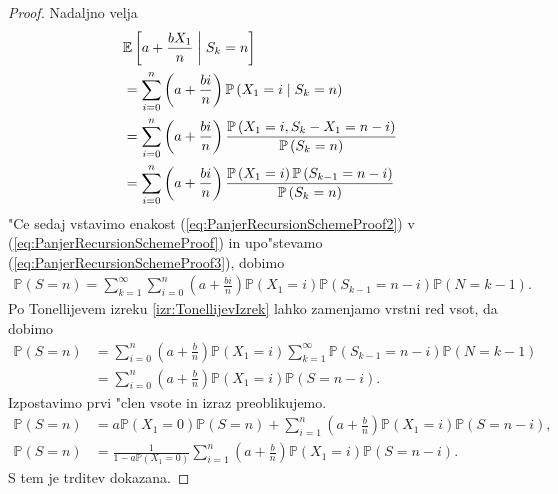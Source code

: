 \documentclass[12pt, a4paper, reqno]{amsart}
\theoremstyle{definition}
\theoremstyle{plain}
\newcommand{\E}{\mathbb{E}}
\newcommand{\Prob}{\mathbb{P}}
\newcommand{\1}{\mathds{1}}
\newcommand*{\refPriloga}[1]{%
  \begingroup
    \hypersetup{
      linkcolor=red,
      linkbordercolor=red,
    }%
    \ref{#1}%
  \endgroup
}
\begin{document}
\begin{proof}
        Nadaljno velja  
        \begin{align}   
            & \E\left[a + \frac{bX_1}{n} \biggm|   S_k = n\right] \nonumber \\
            &= \sum_{i = 0}^n\left(a + \frac{bi}{n}\right)\Prob\left(X_1 = i\mid S_k = n\right) \nonumber \\
            &= \sum_{i = 0}^n\left(a + \frac{bi}{n}\right)\frac{\Prob\left(X_1 = i, S_k - X_1 = n - i\right)}{\Prob\left(S_k = n\right)} \nonumber \\
            &= \sum_{i = 0}^n\left(a + \frac{bi}{n}\right)\frac{\Prob\left(X_1 = i\right)\Prob\left(S_{k- 1} = n - i\right)}{\Prob\left(S_k = n\right)} \label{eq:PanjerRecursionSchemeProof3} 
        \end{align}
        "Ce sedaj vstavimo enakost (\ref{eq:PanjerRecursionSchemeProof2}) v (\ref{eq:PanjerRecursionSchemeProof}) 
        in upo"stevamo (\ref{eq:PanjerRecursionSchemeProof3}), dobimo
        \begin{align*}
            \Prob\left(S = n\right) 
                = \sum_{k = 1}^\infty\sum_{i = 0}^n \left(a + \frac{bi}{n}\right)\Prob\left(X_1 = i\right)\Prob\left(S_{k - 1} = n - i\right)\Prob\left(N = k - 1\right).
        \end{align*}
        Po Tonellijevem izreku \refPriloga{izr:TonellijevIzrek} lahko zamenjamo vrstni red vsot, da dobimo
        \begin{align*}
            \Prob\left(S = n\right) 
                &= \sum_{i = 0}^n\left(a + \frac{b}{n}\right)\Prob\left(X_1 = i\right)\sum_{k = 1}^\infty\Prob\left(S_{k - 1} = n - i\right)\Prob\left(N = k - 1\right)\\
                &= \sum_{i = 0}^n\left(a + \frac{b}{n}\right)\Prob\left(X_1 = i\right)\Prob\left(S = n - i\right).
        \end{align*}
        Izpostavimo prvi "clen vsote in izraz preoblikujemo.
        \begin{align*}
            \Prob\left(S = n\right) 
                &= a\Prob\left(X_1 = 0\right)\Prob\left(S = n\right) + \sum_{i = 1}^n\left(a + \frac{b}{n}\right)\Prob\left(X_1 = i\right)\Prob\left(S = n - i\right), \\
            \Prob\left(S = n\right)
                &= \frac{1}{1 - a\Prob\left(X_1 = 0\right)}\sum_{i = 1}^n\left(a + \frac{b}{n}\right)\Prob\left(X_1 = i\right)\Prob\left(S = n - i\right).
        \end{align*}
        S tem je trditev dokazana.
    \end{proof}
\end{document}
